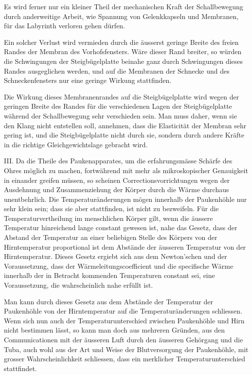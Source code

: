 \documentclass[12pt,a4paper]{article}
\begin{document}
Es wird ferner nur ein kleiner Theil der mechanischen Kraft der Schallbewegung durch anderweitige Arbeit, wie Spannung von Gelenkkapseln und Membranen, f\"ur das Labyrinth verloren gehen d\"urfen.

Ein solcher Verlust wird vermieden durch die \"ausserst geringe Breite des freien Randes der Membran des Vorhofsfensters. W\"are dieser Rand breiter, so w\"urden die Schwingungen der Steigb\"ugelplatte beinahe ganz durch Schwingungen dieses Randes ausgeglichen werden, und auf die Membranen der Schnecke und des Schneckenfensters nur eine geringe Wirkung stattfinden.

Die Wirkung dieses Membranenrandes auf die Steigb\"ugelplatte wird wegen der geringen Breite des Randes f\"ur die verschiedenen Lagen der Steigb\"ugelplatte w\"ahrend der Schallbewegung sehr verschieden sein. Man muss daher, wenn sie den Klang nicht entstellen soll, annehmen, dass die Elasticit\"at der Membran sehr gering ist, und die Steigb\"ugelplatte nicht durch sie, sondern durch andere Kr\"afte in die richtige Gleichgewichtslage gebracht wird.

III. Da die Theile des Paukenapparates, um die erfahrungsm\"asse Sch\"arfe des Ohres m\"oglich zu machen, fortw\"ahrend mit mehr als mikroskopischer Genauigkeit in einander greifen m\"ussen, so scheinen Correctionsvorrichtungen wegen der Ausdehnung und Zusammenziehung der K\"orper durch die W\"arme durchaus unentbehrlich. Die Temperatur\"anderungen m\"ogen innerhalb der Paukenh\"ohle nur sehr klein sein; dass sie aber stattfinden, ist nicht zu bezweifeln. F\"ur die Temperaturvertheilung im menschlichen K\"orper gilt, wenn die \"aussere Temperatur hinreichend lange constant gewesen ist, nahe das Gesetz, dass der Abstand der Temperatur an einer beliebigen Stelle des K\"orpers von der Hirntemperatur proportional ist dem Abst\"ande der \"ausseren Temperatur von der Hirntemperatur. Dieses Gesetz ergiebt sich aus dem Newton'schen und der Voraussetzung, dass der W\"armeleitungscoefficient und die specifische W\"arme innerhalb der in Betracht kommenden Temperaturen constant sei, eine Voraussetzung, die wahrscheinlich nahe erf\"ullt ist.

Man kann durch dieses Gesetz aus dem Abst\"ande der Temperatur der Paukenh\"ohle von der Hirntemperatur auf die Temperatur\"anderungen schliessen. Wenn sich nun auch der Temperaturunterschied zwischen Paukenh\"ohle und Hirn nicht bestimmen l\"asst, so kann man doch aus mehreren Gr\"unden, aus den Communicationen mit der \"ausseren Luft durch den \"ausseren Geh\"organg und die Tuba, auch wohl aus der Art und Weise der Blutversorgung der Paukenh\"ohle, mit grosser Wahrscheinlichkeit schliessen, dass ein merklicher Temperaturunterschied stattfindet.
\end{document}
